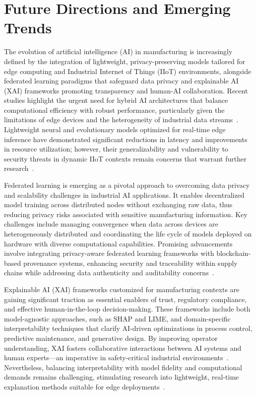 \documentclass[sigconf]{acmart}
\begin{document}
\section{Future Directions and Emerging Trends}

The evolution of artificial intelligence (AI) in manufacturing is increasingly defined by the integration of lightweight, privacy-preserving models tailored for edge computing and Industrial Internet of Things (IIoT) environments, alongside federated learning paradigms that safeguard data privacy and explainable AI (XAI) frameworks promoting transparency and human-AI collaboration. Recent studies highlight the urgent need for hybrid AI architectures that balance computational efficiency with robust performance, particularly given the limitations of edge devices and the heterogeneity of industrial data streams~\cite{ref5,ref30}. Lightweight neural and evolutionary models optimized for real-time edge inference have demonstrated significant reductions in latency and improvements in resource utilization; however, their generalizability and vulnerability to security threats in dynamic IIoT contexts remain concerns that warrant further research~\cite{ref31}.

Federated learning is emerging as a pivotal approach to overcoming data privacy and scalability challenges in industrial AI applications. It enables decentralized model training across distributed nodes without exchanging raw data, thus reducing privacy risks associated with sensitive manufacturing information. Key challenges include managing convergence when data across devices are heterogeneously distributed and coordinating the life cycle of models deployed on hardware with diverse computational capabilities. Promising advancements involve integrating privacy-aware federated learning frameworks with blockchain-based provenance systems, enhancing security and traceability within supply chains while addressing data authenticity and auditability concerns~\cite{ref6,ref25,ref41}.

Explainable AI (XAI) frameworks customized for manufacturing contexts are gaining significant traction as essential enablers of trust, regulatory compliance, and effective human-in-the-loop decision-making. These frameworks include both model-agnostic approaches, such as SHAP and LIME, and domain-specific interpretability techniques that clarify AI-driven optimizations in process control, predictive maintenance, and generative design. By improving operator understanding, XAI fosters collaborative interactions between AI systems and human experts—an imperative in safety-critical industrial environments~\cite{ref35,ref44}. Nevertheless, balancing interpretability with model fidelity and computational demands remains challenging, stimulating research into lightweight, real-time explanation methods suitable for edge deployments~\cite{ref38}.
\end{document}
